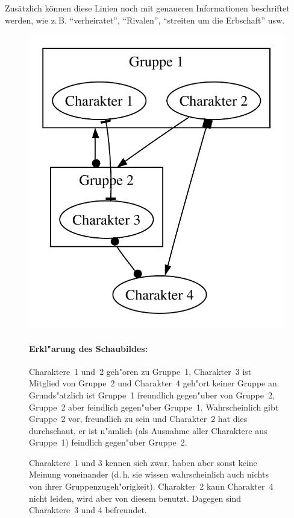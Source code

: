 Zusätzlich können diese Linien noch mit genaueren Informationen beschriftet werden, wie z.\,B. ``verheiratet'', ``Rivalen'', ``streiten um die Erbschaft'' usw.

\begin{figure}
\centerline{\includegraphics[height=0.55\textheight]{pics/web1}}

\paragraph{Erkl"arung des Schaubildes:} Charaktere~1 und~2 geh"oren zu Gruppe~1, Charakter~3 ist Mitglied von Gruppe~2 und Charakter~4 geh"ort keiner Gruppe an. Grunds"atzlich ist Gruppe~1 freundlich gegen"uber von Gruppe~2, Gruppe~2 aber feindlich gegen"uber Gruppe~1. Wahrscheinlich gibt Gruppe~2 vor, freundlich zu sein und Charakter~2 hat dies durchschaut, er ist n"amlich (als Ausnahme aller Charaktere aus Gruppe~1) feindlich gegen"uber Gruppe~2.

Charaktere~1 und 3 kennen sich zwar, haben aber sonst keine Meinung voneinander (d.\,h. sie wissen wahrscheinlich auch nichts von ihrer Gruppenzugeh"origkeit). Charakter~2 kann Charakter~4 nicht leiden, wird aber von diesem benutzt. Dagegen sind Charaktere~3 und 4 befreundet.

\label{ConflictWeb1}
\end{figure}








